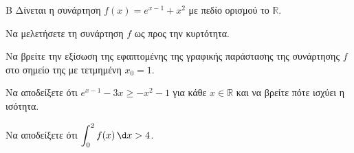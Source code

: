 \begin{thema}{Β}
Δίνεται η συνάρτηση $f(x) = e^{x-1} + x^2$ με πεδίο ορισμού το $\mathbb{R}$.
\begin{erwthma}
\item Να μελετήσετε τη συνάρτηση $f$ ως προς την κυρτότητα.
\item Να βρείτε την εξίσωση της εφαπτομένης της γραφικής παράστασης της συνάρτησης $f$ στο σημείο της με τετμημένη $x_0 = 1$.
\item Να αποδείξετε ότι $e^{x-1} -3x \ge -x^2 - 1$ για κάθε $x \in \mathbb{R}$ και να βρείτε πότε ισχύει η ισότητα.
\item Να αποδείξετε ότι $\displaystyle\int_{0}^{2} f(x)\,\d x > 4$.
\end{erwthma}
\end{thema}
